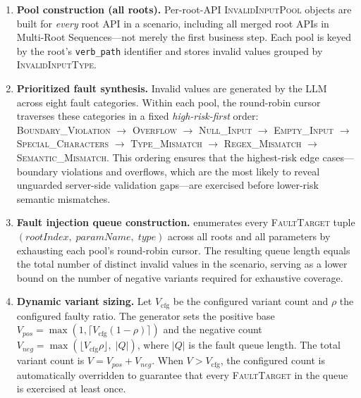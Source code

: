 \documentclass[conference]{IEEEtran}
\begin{document}
\begin{enumerate}[leftmargin=*]
  \item \textbf{Pool construction (all roots).} Per-root-API \textsc{InvalidInputPool} objects are built for \emph{every} root API in a scenario, including all merged root APIs in Multi-Root Sequences—not merely the first business step. Each pool is keyed by the root's \texttt{verb\_path} identifier and stores invalid values grouped by \textsc{InvalidInputType}.

  \item \textbf{Prioritized fault synthesis.} Invalid values are generated by the LLM across eight fault categories. Within each pool, the round-robin cursor traverses these categories in a fixed \emph{high-risk-first} order: \textsc{Boundary\_Violation} $\to$ \textsc{Overflow} $\to$ \textsc{Null\_Input} $\to$ \textsc{Empty\_Input} $\to$ \textsc{Special\_Characters} $\to$ \textsc{Type\_Mismatch} $\to$ \textsc{Regex\_Mismatch} $\to$ \textsc{Semantic\_Mismatch}. This ordering ensures that the highest-risk edge cases---boundary violations and overflows, which are the most likely to reveal unguarded server-side validation gaps---are exercised before lower-risk semantic mismatches.

  \item \textbf{Fault injection queue construction.}  enumerates every \textsc{FaultTarget} tuple $(\mathit{rootIndex},\;\mathit{paramName},\;\mathit{type})$ across all roots and all parameters by exhausting each pool's round-robin cursor. The resulting queue length equals the total number of distinct invalid values in the scenario, serving as a lower bound on the number of negative variants required for exhaustive coverage.

  \item \textbf{Dynamic variant sizing.} Let $V_\mathrm{cfg}$ be the configured variant count and $\rho$ the configured faulty ratio. The generator sets the positive base $V_{\mathit{pos}} = \max(1, \lceil V_\mathrm{cfg}(1-\rho)\rceil)$ and the negative count $V_{\mathit{neg}} = \max(\lfloor V_\mathrm{cfg}\rho\rfloor,\;|Q|)$, where $|Q|$ is the fault queue length. The total variant count is $V = V_{\mathit{pos}} + V_{\mathit{neg}}$. When $V > V_\mathrm{cfg}$, the configured count is automatically overridden to guarantee that every \textsc{FaultTarget} in the queue is exercised at least once.


\end{enumerate}
\end{document}
